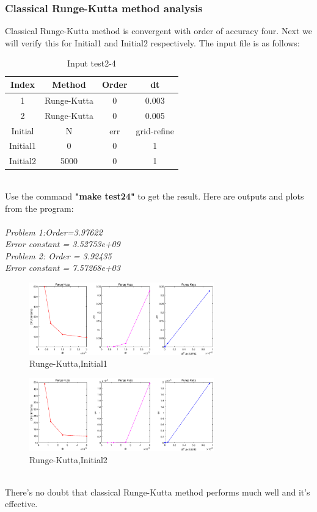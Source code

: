 \documentclass[a4paper,twocolumn]{article}
\theoremstyle{definition}
\begin{document}
\subsubsection{Classical Runge-Kutta method analysis}
Classical Runge-Kutta method is convergent with order of
accuracy four. Next we will verify this for Initial1 and Initial2 respectively. The input file is as follows:
\begin{table}[!htp]
	\centering
	\begin{tabular}{|c|c|c|c|}
		\hline	
		Index & Method & Order & dt \\
		\hline		
		1 & Runge-Kutta & 0 & 0.003   \\	
		\hline		
		2 & Runge-Kutta & 0 & 0.005   \\	
		\hline \hline
		Initial & N & err & grid-refine \\
		\hline
		Initial1 & 0 & 0 & 1 \\
		\hline
		Initial2 & 5000 & 0 & 1 \\
		\hline
	\end{tabular}
	\caption{Input test2-4}
	\label{tab:test24}
\end{table}\\
Use the command \textbf{"make test24"} to get the result. Here are outputs and plots from the program:\\\\
\emph{Problem 1:Order=3.97622}\\
\emph{Error constant = 3.52753e+09}\\
\emph{Problem 2: Order = 3.92435}\\
\emph{Error constant = 7.57268e+03}
\begin{figure}[!htp]   
	\centering
	\includegraphics[width=8cm]{Pictures/2_4_1.eps}
	\caption{Runge-Kutta,Initial1}
	\label{fig:RK1gf}
\end{figure}
\begin{figure}[!htp]   
	\centering
	\includegraphics[width=8cm]{Pictures/2_4_2.eps}
	\caption{Runge-Kutta,Initial2}
	\label{fig:RK2gf}
\end{figure}\\
\noindent There's no doubt that classical Runge-Kutta method performs much well and it's effective.
\end{document}
